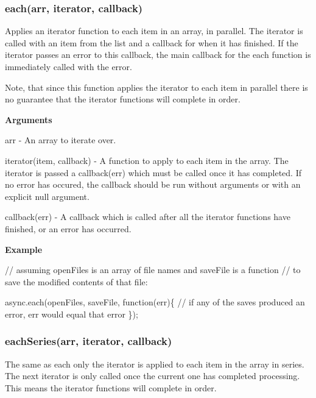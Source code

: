 \label{_forEach}%
 \label{_each}%
 \subsubsection*{each(arr, iterator, callback)}

Applies an iterator function to each item in an array, in parallel. The iterator is called with an item from the list and a callback for when it has finished. If the iterator passes an error to this callback, the main callback for the each function is immediately called with the error.

Note, that since this function applies the iterator to each item in parallel there is no guarantee that the iterator functions will complete in order.

{\bfseries Arguments}


\begin{DoxyItemize}
\item arr -\/ An array to iterate over.
\item iterator(item, callback) -\/ A function to apply to each item in the array. The iterator is passed a callback(err) which must be called once it has completed. If no error has occured, the callback should be run without arguments or with an explicit null argument.
\item callback(err) -\/ A callback which is called after all the iterator functions have finished, or an error has occurred.
\end{DoxyItemize}

{\bfseries Example}


\begin{DoxyCode}
// assuming openFiles is an array of file names and saveFile is a function
// to save the modified contents of that file:

async.each(openFiles, saveFile, function(err)\{
    // if any of the saves produced an error, err would equal that error
\});
\end{DoxyCode}
 



\label{_forEachSeries}%
 \label{_eachSeries}%
 \subsubsection*{each\+Series(arr, iterator, callback)}

The same as each only the iterator is applied to each item in the array in series. The next iterator is only called once the current one has completed processing. This means the iterator functions will complete in order.





